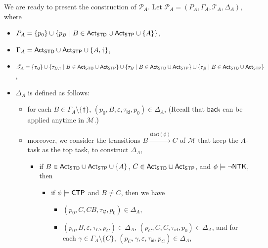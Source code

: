 \documentclass[preprint,12pt]{elsarticle}
\newcommand\Mm{{\mathcal{M} }}
\newcommand\Pp{{\mathcal{P} }}
\newcommand\act{{\sf Act}}
\newcommand\standard{{\sf STD}}
\newcommand\singletop{{\sf STP}}
\newcommand\ntkflag{{\sf NTK}}
\newcommand\ctpflag{{\sf CTP}}
\newcommand\back{{\mathsf{back} }}
\newcommand\startactivity{{\mathsf{start} }}
\newcommand{\id}{\mathsf{id}}
\newcommand\TranSet{{\mathscr{T} }}
\begin{document}
We are ready to present the construction of $\Pp_A$. Let $\Pp_A = (P_A, \Gamma_A, \TranSet_A, \Delta_A)$, where 
\begin{itemize}
\item $P_{A} = \{p_0\}\cup\{ p_{B}\mid B \in  \act_\standard \cup \act_\singletop \cup \{A\}\}$,
\item $\Gamma_{A} = \act_\standard \cup \act_\singletop \cup \{A, \dag\}$, 
\item $\TranSet_A = \{\tau_{\id} \}\cup \{\tau_{B, \dag} \mid B \in \act_\standard \cup \act_\singletop \} \cup \{\tau_{B} \mid B \in \act_\standard \cup \act_\singletop\}  \cup \{\tau_{\not B} \mid B \in \act_\standard \cup \act_\singletop\}$, 
\item $\Delta_{A}$ is defined as follows:
        \begin{itemize}
            \item for each $B \in \Gamma_{A} \setminus \{\dag\}$, $(p_0, B, \varepsilon, \tau_{\id}, p_0) \in \Delta_{A}$, (Recall that $\back$ can be applied anytime in $\Mm$.)
	    \item moreover, we consider the transitions $B \xrightarrow{\startactivity(\phi)} C$ of $\Mm$ that keep the $A$-task as the top task, to construct $\Delta_A$, 
			\begin{itemize}
				\item if $B \in \act_\standard \cup \act_\singletop \cup \{A\}$, $C \in \act_\standard \cup \act_\singletop$, and $\phi \models \neg \ntkflag$, then 
				\begin{itemize}
				\item if $\phi \models \ctpflag$ and $B \neq C$, then we have 
				\begin{itemize}
					\item $(p_0, C, CB, \tau_{\not C}, p_0) \in \Delta_{A}$, 
					\item $(p_0, B, \varepsilon, \tau_{C}, p_C) \in \Delta_{A}$, $(p_C, C, C, \tau_{\id}, p_0)  \in \Delta_{A}$, and for each $\gamma \in \Gamma_A \setminus \{C\}$, $(p_C, \gamma, \varepsilon, \tau_{\id}, p_C) \in \Delta_{A}$, 

\end{itemize}
\end{itemize}
\end{itemize}
\end{itemize}
\end{itemize}
\end{document}
